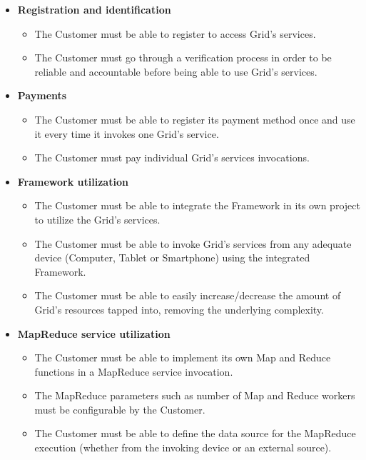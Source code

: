 \begin{itemize}
    \item \textbf{Registration and identification}
    \begin{itemize}
        \item The Customer must be able to register to access Grid's services.
        \item The Customer must go through a verification process in order to be reliable and accountable before being able to use Grid's services.
    \end{itemize}
    \item \textbf{Payments}
    \begin{itemize}
        \item The Customer must be able to register its payment method once and use it every time it invokes one Grid's service.
        \item The Customer must pay individual Grid's services invocations.
    \end{itemize}
    \item \textbf{Framework utilization}
    \begin{itemize}
        \item The Customer must be able to integrate the Framework in its own project to utilize the Grid's services.
        \item The Customer must be able to invoke Grid’s services from any adequate device (Computer, Tablet or Smartphone) using the integrated Framework.
        \item The Customer must be able to easily increase/decrease the amount of Grid's resources tapped into, removing the underlying complexity.
    \end{itemize}
    \item \textbf{MapReduce service utilization}
    \begin{itemize}
        \item The Customer must be able to implement its own Map and Reduce functions in a MapReduce service invocation.
        \item The MapReduce parameters such as number of Map and Reduce workers must be configurable by the Customer.
        \item The Customer must be able to define the data source for the MapReduce execution (whether from the invoking device or an external source).
    \end{itemize}
\end{itemize}
